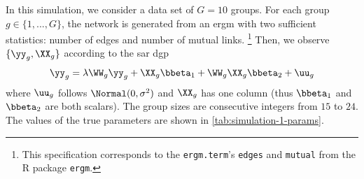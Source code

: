 In this simulation, we consider a data set of $G=10$ groups.
For each group $g\in\{1,...,G\}$, the network is generated from an \acrshort{ergm} with two sufficient statistics:
number of edges and number of mutual links.
\footnote{This specification corresponds to the \Verb"ergm.term"'s \Verb"edges" and \Verb"mutual" from the R package \Verb"ergm".}
Then, we observe $\{\yy_{g},\XX_{g}\}$ according to the \acrshort{sar} \acrshort{dgp}
\begin{align*}
	\yy_{g} = \lambda \WW_{g} \yy_{g} + \XX_{g} \bbeta_{1} + \WW_{g} \XX_{g} \bbeta_{2} + \uu_{g}
\end{align*}
where $\uu_{g}$ follows $\Normal(0,\sigma^2)$ and $\XX_{g}$ has one column (thus $\bbeta_1$ and $\bbeta_2$ are both scalars).
The group sizes are consecutive integers from $15$ to $24$.
The values of the true parameters are shown in \autoref{tab:simulation-1-params}.

